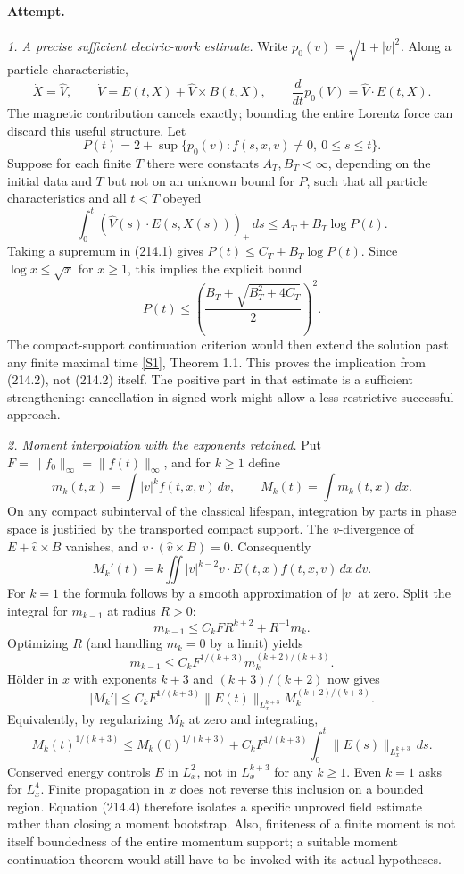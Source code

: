 \documentclass[11pt,a4paper]{article}
\newcommand{\sref}[2]{\hyperlink{source:#1:#2}{[S#2]}}
\begin{document}
\paragraph{Attempt.}
\textit{1. A precise sufficient electric-work estimate.}
Write $p_0(v)=\sqrt{1+|v|^2}$. Along a particle characteristic,
\[
 \dot X=\widehat V,\qquad \dot V=E(t,X)+\widehat V\times B(t,X),
 \qquad \frac{d}{dt}p_0(V)=\widehat V\cdot E(t,X).              \tag{214.1}
\]
The magnetic contribution cancels exactly; bounding the entire Lorentz force
can discard this useful structure. Let
\[
 P(t)=2+\sup\{p_0(v):f(s,x,v)\ne0,\ 0\le s\le t\}.
\]
Suppose for each finite $T$ there were constants $A_T,B_T<\infty$, depending
on the initial data and $T$ but not on an unknown bound for $P$, such that
all particle characteristics and all $t<T$ obeyed
\[
 \int_0^t(\widehat V(s)\cdot E(s,X(s)))_+\,ds
       \le A_T+B_T\log P(t).                                 \tag{214.2}
\]
Taking a supremum in (214.1) gives $P(t)\le C_T+B_T\log P(t)$.
Since $\log x\le\sqrt x$ for $x\ge1$, this implies the explicit bound
\[
 P(t)\le\left(\frac{B_T+\sqrt{B_T^2+4C_T}}2\right)^2.
\]
The compact-support continuation criterion would then extend the solution
past any finite maximal time \sref{statement}{1}, Theorem 1.1. This proves the
implication from (214.2), not (214.2) itself. The positive part in that
estimate is a sufficient strengthening: cancellation in signed work might
allow a less restrictive successful approach.

\textit{2. Moment interpolation with the exponents retained.}
Put $F=\|f_0\|_\infty=\|f(t)\|_\infty$, and for $k\ge1$ define
\[
 m_k(t,x)=\int|v|^k f(t,x,v)\,dv,\qquad M_k(t)=\int m_k(t,x)\,dx.
\]
On any compact subinterval of the classical lifespan, integration by parts
in phase space is justified by the transported compact support. The
$v$-divergence of $E+\widehat v\times B$ vanishes, and
$v\cdot(\widehat v\times B)=0$. Consequently
\[
 M_k'(t)=k\iint |v|^{k-2}v\cdot E(t,x)f(t,x,v)\,dx\,dv.
                                                               \tag{214.3}
\]
For $k=1$ the formula follows by a smooth approximation of $|v|$ at zero.
Split the integral for $m_{k-1}$ at radius $R>0$:
\[
 m_{k-1}\le C_k F R^{k+2}+R^{-1}m_k.
\]
Optimizing $R$ (and handling $m_k=0$ by a limit) yields
\[
 m_{k-1}\le C_kF^{1/(k+3)}m_k^{(k+2)/(k+3)}.
\]
H\"older in $x$ with exponents $k+3$ and $(k+3)/(k+2)$ now gives
\[
 |M_k'|\le C_kF^{1/(k+3)}\|E(t)\|_{L^{k+3}_x}
                     M_k^{(k+2)/(k+3)}.
\]
Equivalently, by regularizing $M_k$ at zero and integrating,
\[
 M_k(t)^{1/(k+3)}\le M_k(0)^{1/(k+3)}+
 C_k F^{1/(k+3)}\int_0^t\|E(s)\|_{L^{k+3}_x}\,ds.             \tag{214.4}
\]
Conserved energy controls $E$ in $L^2_x$, not in $L^{k+3}_x$ for any
$k\ge1$. Even $k=1$ asks for $L^4_x$. Finite propagation in $x$ does not
reverse this inclusion on a bounded region. Equation (214.4) therefore
isolates a specific unproved field estimate rather than closing a moment
bootstrap. Also, finiteness of a finite moment is not itself boundedness of
the entire momentum support; a suitable moment continuation theorem would
still have to be invoked with its actual hypotheses.
\end{document}
